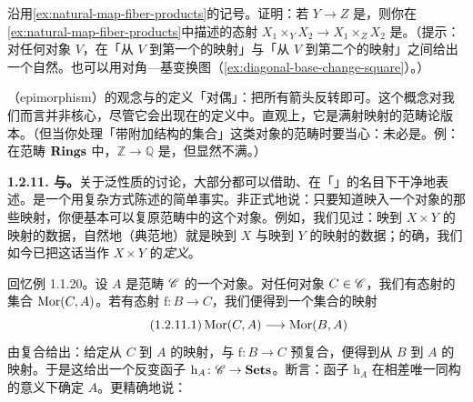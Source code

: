 \begin{exercise}[容易的练习]\label{ex:base-change-along-monomorphisms}
沿用\cref{ex:natural-map-fiber-products}的记号。证明：若 $Y\to Z$ 是\trMonomorphism，则你在\cref{ex:natural-map-fiber-products}中描述的态射 $X_1\times_Y X_2\to X_1\times_Z X_2$ 是\trIsomorphism。（提示：对任何对象 $V$，在「从 $V$ 到第一个的映射」与「从 $V$ 到第二个的映射」之间给出一个自然\trBijection。也可以用对角—基变换图（\cref{ex:diagonal-base-change-square}）。）
\end{exercise}

\textbf{\trEpimorphism}（epimorphism）的观念与\trMonomorphism{}的定义「对偶」：把所有箭头反转即可。这个概念对我们而言并非核心，尽管它会出现在\trAbelianCategory{}的定义中。直观上，它是满射映射的范畴论版本。（但当你处理「带附加结构的集合」这类对象的范畴时要当心：\trEpimorphism{}未必是\trSurjectiveMap{}。例：在范畴 $\mathbf{Rings}$ 中，$\mathbb{Z}\to\mathbb{Q}$ 是\trEpimorphism，但显然不满。）

\textbf{1.2.11. \trRepresentableFunctor{}与\trYonedaLemma。}\quad 关于泛性质的讨论，大部分都可以借助\trRepresentableFunctor、在「\trYonedaLemma」的名目下干净地表述。\trYonedaLemma{}是一个用复杂方式陈述的简单事实。非正式地说：只要知道映入一个对象的那些映射，你便基本可以复原范畴中的这个对象。例如，我们见过：映到 $X\times Y$ 的映射的数据，自然地（典范地）就是映到 $X$ 与映到 $Y$ 的映射的数据；的确，我们如今已把这话当作 $X\times Y$ 的\emph{定义}。

回忆例 1.1.20。设 $A$ 是范畴 $\mathscr{C}$ 的一个对象。对任何对象 $C\in\mathscr{C}$，我们有态射的集合 $\operatorname{Mor}(C,A)$。若有态射 $\mathrm{f}\colon B\to C$，我们便得到一个集合的映射
\begin{equation*}\tag{1.2.11.1}\label{eq:contravariant-composition-map}
\operatorname{Mor}(C,A)\longrightarrow\operatorname{Mor}(B,A)
\end{equation*}
由复合给出：给定从 $C$ 到 $A$ 的映射，与 $\mathrm{f}\colon B\to C$ 预复合，便得到从 $B$ 到 $A$ 的映射。于是这给出一个反变函子 $\mathrm{h}_A\colon\mathscr{C}\to\mathbf{Sets}$。\trYonedaLemma{}断言：函子 $\mathrm{h}_A$ 在相差唯一同构的意义下确定 $A$。更精确地说：

